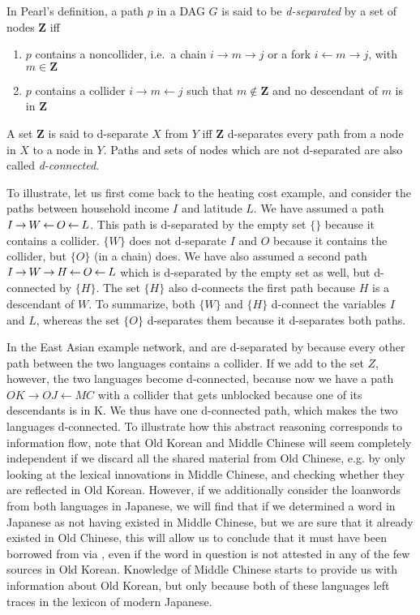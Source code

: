 In Pearl's definition, a path $p$ in a DAG $G$ is said to be \textit{d-separated} by a set of nodes $\mathbf{Z}$ iff
\begin{enumerate}
  \item $p$ contains a noncollider, i.e.\ a chain $i \rightarrow m \rightarrow j$ or a fork $i \leftarrow m \rightarrow j$, with $m \in \mathbf{Z}$
  \item $p$ contains a collider $i \rightarrow m \leftarrow j$ such that $m \notin \mathbf{Z}$ and no descendant of $m$ is in $\mathbf{Z}$
\end{enumerate}
A set $\mathbf{Z}$ is said to d-separate $X$ from $Y$ iff $\mathbf{Z}$ d-separates every path from a node in $X$ to a node in $Y$. Paths and sets of nodes which are not d-separated are also called \textit{d-connected}.

To illustrate, let us first come back to the heating cost example, and consider the paths between household income $I$ and latitude $L$. We have assumed a path $I \kern 2pt\hbox{$\rightarrow$}\kern 2pt W \kern 2pt\hbox{$\leftarrow$}\kern 2pt O \kern 2pt\hbox{$\leftarrow$}\kern 2pt L$. This path is d-separated by the empty set $\{\}$ because it contains a collider. $\{W\}$ does not d-separate $I$ and $O$ because it contains the collider, but $\{O\}$ (in a chain) does. We have also assumed a second path $I \kern 2pt\hbox{$\rightarrow$}\kern 2pt W \kern 2pt\hbox{$\rightarrow$}\kern 2pt H \kern 2pt\hbox{$\leftarrow$}\kern 2pt O \kern 2pt\hbox{$\leftarrow$}\kern 2pt L$ which is d-separated by the empty set as well, but d-connected by $\{H\}$. The set $\{H\}$ also d-connects the first path because $H$ is a descendant of $W$. To summarize, both $\{W\}$ and $\{H\}$ d-connect the variables $I$ and $L$, whereas the set $\{O\}$ d-separates them because it d-separates both paths.

In the East Asian example network,  and  are d-separated by  because every other path between the two languages contains a collider. If we add  to the set $Z$, however, the two languages become d-connected, because now we have a path $OK \rightarrow OJ \leftarrow MC$ with a collider that gets unblocked because one of its descendants is in K. We thus have one d-connected path, which makes the two languages d-connected. To illustrate how this abstract reasoning corresponds to information flow, note that Old Korean and Middle Chinese will seem completely independent if we discard all the shared material from Old Chinese, e.g. by only looking at the lexical innovations in Middle Chinese, and checking whether they are reflected in Old Korean. However, if we additionally consider the loanwords from both languages in Japanese, we will find that if we determined a word in Japanese as not having existed in Middle Chinese, but we are sure that it 
already existed in Old Chinese, this will allow us to conclude that it must have been borrowed from  via , even if the word in question is not attested in any of the few sources in Old Korean. Knowledge of Middle Chinese starts to provide us with information about Old Korean, but only because both of these languages left traces in the lexicon of modern Japanese.


